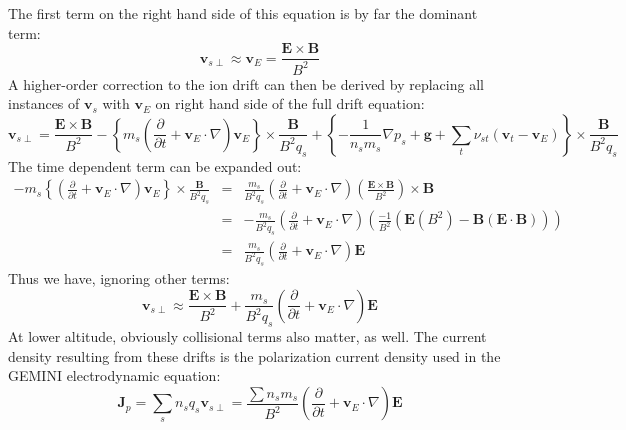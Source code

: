 \documentclass[11pt,letterpaper]{article}
\begin{document}
The first term on the right hand side of this equation is by far the dominant term:
\begin{equation}
\mathbf{v}_{s\perp} \approx \mathbf{v}_{E} = \frac{\mathbf{E} \times \mathbf{B}}{B^2}
\end{equation}
A higher-order correction to the ion drift can then be derived by replacing all instances of $\mathbf{v}_s$ with $\mathbf{v}_E$ on right hand side of the full drift equation:
\begin{equation}
\mathbf{v}_{s\perp} = \frac{\mathbf{E} \times \mathbf{B}}{B^2} - \left\{ m_s \left( \frac{\partial }{\partial t}  + \mathbf{v}_{E} \cdot \nabla \right) \mathbf{v}_{E} \right\} \times \frac{\mathbf{B}}{B^2 q_s} + \left\{ - \frac{1}{n_s m_s} \nabla p_s + \mathbf{g} + \sum_t \nu_{st} \left(\mathbf{v}_t - \mathbf{v}_{E} \right) \right \} \times \frac{\mathbf{B}}{B^2 q_s}
\end{equation}
The time dependent term can be expanded out:  
\begin{eqnarray}
- m_s \left\{ \left( \frac{\partial }{\partial t}  + \mathbf{v}_{E} \cdot \nabla \right) \mathbf{v}_{E} \right\} \times \frac{\mathbf{B}}{B^2 q_s} &=& \frac{m_s}{B^2 q_s} \left( \frac{\partial }{\partial t}  + \mathbf{v}_{E} \cdot \nabla \right)  \left( \frac{\mathbf{E} \times \mathbf{B}}{B^2} \right) \times \mathbf{B} \\ &=& -\frac{m_s}{B^2 q_s} \left( \frac{\partial }{\partial t}  + \mathbf{v}_{E} \cdot \nabla \right)  \left( \frac{-1}{B^2} ( \mathbf{E} (B^2) - \mathbf{B} (\mathbf{E} \cdot \mathbf{B}) ) \right) \\ &=& \frac{m_s}{B^2 q_s} \left( \frac{\partial }{\partial t}  + \mathbf{v}_{E} \cdot \nabla \right) \mathbf{E}
\end{eqnarray}
Thus we have, ignoring other terms:
\begin{equation}
\mathbf{v}_{s\perp} \approx \frac{\mathbf{E} \times \mathbf{B}}{B^2} + \frac{m_s}{B^2 q_s} \left( \frac{\partial }{\partial t}  + \mathbf{v}_{E} \cdot \nabla \right) \mathbf{E}
\end{equation}
At lower altitude, obviously collisional terms also matter, as well.  The current density resulting from these drifts is the polarization current density used in the GEMINI electrodynamic equation:  
\begin{equation}
\mathbf{J}_p = \sum_s n_s q_s \mathbf{v}_{s\perp} = \frac{\sum n_s m_s }{B^2} \left( \frac{\partial }{\partial t}  + \mathbf{v}_{E} \cdot \nabla \right) \mathbf{E}
\end{equation}
\end{document}
